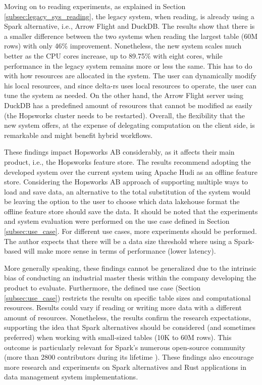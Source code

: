 Moving on to reading experiments, as explained in Section \ref{subsec:legacy_sys_reading}, the legacy system, when reading, is already using a Spark alternative, i.e., Arrow Flight and DuckDB. The results show that there is a smaller difference between the two systems when reading the largest table (60M rows) with only 46\% improvement. Nonetheless, the new system scales much better as the \gls{CPU} cores increase, up to 89.75\% with eight cores, while performance in the legacy system remains more or less the same. This has to do with how resources are allocated in the system. The user can dynamically modify his local resources, and since delta-rs uses local resources to operate, the user can tune the system as needed. On the other hand, the Arrow Flight server using DuckDB has a predefined amount of resources that cannot be modified as easily (the Hopsworks cluster needs to be restarted). Overall, the flexibility that the new system offers, at the expense of delegating computation on the client side, is remarkable and might benefit hybrid workflows.

These findings impact Hopsworks \gls{AB} considerably, as it affects their main product, i.e., the Hopsworks feature store. The results recommend adopting the developed system over the current system using Apache Hudi as an offline feature store. Considering the Hopsworks \gls{AB} approach of supporting multiple ways to load and save data, an alternative to the total substitution of the system would be leaving the option to the user to choose which data lakehouse format the offline feature store should save the data. It should be noted that the experiments and system evaluation were performed on the use case defined in Section \ref{subsec:use_case}. For different use cases, more experiments should be performed. The author expects that there will be a data size threshold where using a Spark-based will make more sense in terms of performance (lower latency).

More generally speaking, these findings cannot be generalized due to the intrinsic bias of conducting an industrial master thesis within the company developing the product to evaluate. Furthermore, the defined use case (Section \ref{subsec:use_case}) restricts the results on specific table sizes and computational resources. Results could vary if reading or writing more data with a different amount of resources. Nonetheless, the results confirm the research expectations, supporting the idea that Spark alternatives should be considered (and sometimes preferred) when working with small-sized tables (10K to 60M rows). This outcome is particularly relevant for Spark's numerous open-source community (more than 2800 contributors during its lifetime \cite{ApacheSparkOpen}). These findings also encourage more research and experiments on Spark alternatives and Rust applications in data management system implementations.

